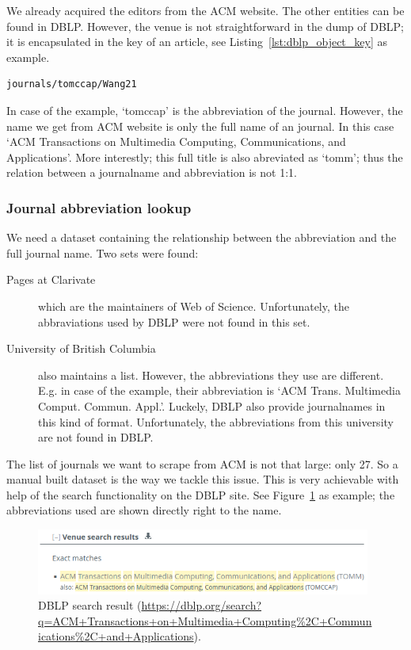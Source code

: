 \documentclass{ou-report}
\begin{document}
We already acquired the editors from the ACM website. The other entities can be 
found in DBLP. 
However, the venue is not straightforward in the dump of DBLP; it is 
encapsulated in the key of an article, see Listing~\ref{lst:dblp_object_key} 
as example.

\lstset{language=XML}
\begin{lstlisting}[caption={Example DBLP key},label={lst:dblp_object_key}]
journals/tomccap/Wang21
\end{lstlisting}

In case of the example, `tomccap' is the abbreviation of the journal. However, 
the name we get from ACM website is only the full name of an journal. In this
case `ACM Transactions on Multimedia Computing, Communications, and
Applications'.
More interestly; this full title is also abreviated as `tomm'; thus the relation
between a journalname and abbreviation is not 1:1.

\subsubsection{Journal abbreviation lookup}
We need a dataset containing the relationship between the abbreviation and the
full journal name. Two sets were found:
\begin{description}
    \item[Pages at Clarivate] which are the maintainers of Web of Science. 
    Unfortunately, the abbraviations used by DBLP were not found in this set.
    \item[University of British Columbia] also maintains a list. However, the 
    abbreviations they use are different. E.g. in case of the example, their
    abbreviation is `ACM Trans. Multimedia Comput. Commun. Appl.'. Luckely, DBLP
    also provide journalnames in this kind of format. Unfortunately, the 
    abbreviations from this university are not found in DBLP.
\end{description}
The list of journals we want to scrape from ACM is not that large: only 27. So
a manual built dataset is the way we tackle this issue. This is very achievable 
with help of the search functionality on the DBLP site. See 
Figure~\ref{fig:dblp_search_result} as example; the abbreviations used are shown
directly right to the name.
\begin{figure}[H]
\centering
\includegraphics[width=11cm]{images/dblp_search_result.png}
\caption{DBLP search result (\url{https://dblp.org/search?q=ACM+Transactions+on+Multimedia+Computing\%2C+Communications\%2C+and+Applications}).}
\label{fig:dblp_search_result}
\end{figure}
\end{document}
